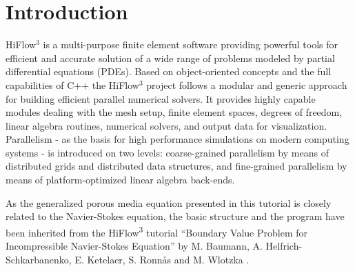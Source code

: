 \documentclass{article}
\begin{document}
\renewcommand{\contentsname}{Contents}

{\parskip 0pt\tableofcontents} %



\graphicspath{{Bilder/}}

\renewcommand{\contentsname}{Introduction}

\pagebreak


\section{Introduction}

HiFlow$^\text{3}$ is a multi-purpose finite element software providing powerful tools for efficient and accurate solution of a wide range of problems modeled by partial differential equations (PDEs). Based on object-oriented concepts and the full capabilities of C++ the HiFlow$^\text{3}$  project follows a modular and generic approach for building efficient parallel numerical solvers. It provides highly capable modules dealing with the mesh setup, finite element spaces, degrees of freedom, linear algebra routines, numerical solvers, and output data for visualization. Parallelism - as the basis for high performance simulations on modern computing systems - is introduced on two levels: coarse-grained parallelism by means of distributed grids and distributed data structures, and fine-grained parallelism by means of platform-optimized linear algebra back-ends.

As the generalized porous media equation presented in this tutorial is closely related to the Navier-Stokes equation, the basic structure and the program have been inherited from the HiFlow\textsuperscript{3} tutorial ``Boundary Value Problem for Incompressible Navier-Stokes
Equation'' by M. Baumann, A. Helfrich-Schkarbanenko, E. Ketelaer, S. Ronn\aa{}s and M. Wlotzka \cite{NSTut}.
\end{document}
